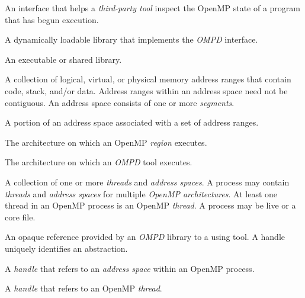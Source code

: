 \glossarydefstart
An interface that helps a \emph{third-party tool} inspect the OpenMP state 
of a program that has begun execution.
\glossarydefend

\glossarydefstart
A dynamically loadable library that implements the \emph{OMPD} interface.
\glossarydefend

\glossarydefstart
An executable or shared library.
\glossarydefend

\glossarydefstart
A collection of logical, virtual, or physical memory address ranges 
that contain code, stack, and/or data. 
Address ranges within an address space need not be contiguous.  
An address space consists of one or more \emph{segments}.
\glossarydefend

\glossarydefstart
A portion of an address space associated with a set of address ranges.
\glossarydefend

\begin{comment}
\glossaryterm{architecture}
\glossarydefstart
A combination of the processor and the Application Binary Interface (ABI) used by
threads and address spaces.
\glossarydefend
\end{comment}

\glossarydefstart
The architecture on which an OpenMP \emph{region} executes.
\glossarydefend

\glossarydefstart
The architecture on which an \emph{OMPD} tool executes.
\glossarydefend

\glossarydefstart
A collection of one or more \emph{threads} and \emph{address spaces}. 
A process may contain \emph{threads} and \emph{address spaces} for 
multiple \emph{OpenMP architectures}. At least one thread in 
an OpenMP process is an OpenMP \emph{thread}.
A process may be live or a core file.
\glossarydefend

\glossarydefstart
An opaque reference provided by an \emph{OMPD} library to a using tool. 
A handle uniquely identifies an abstraction.
\glossarydefend

\glossarydefstart
A \emph{handle} that refers to an \emph{address space} within an OpenMP process.
\glossarydefend

\glossarydefstart
A \emph{handle} that refers to an OpenMP \emph{thread}.
\glossarydefend

